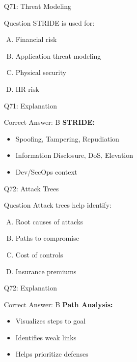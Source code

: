 \documentclass{beamer}
\begin{document}
			\begin{frame}{Q71: Threat Modeling}
				\begin{block}{Question}
					STRIDE is used for:
				\end{block}
				\begin{enumerate}[(A)]
					\item Financial risk
					\item Application threat modeling
					\item Physical security
					\item HR risk
				\end{enumerate}
			\end{frame}
			\begin{frame}{Q71: Explanation}
				\begin{block}{Correct Answer: B}
					\textbf{STRIDE:}
					\begin{itemize}
						\item Spoofing, Tampering, Repudiation
						\item Information Disclosure, DoS, Elevation
						\item Dev/SecOps context
					\end{itemize}
				\end{block}
			\end{frame}
			
			\begin{frame}{Q72: Attack Trees}
				\begin{block}{Question}
					Attack trees help identify:
				\end{block}
				\begin{enumerate}[(A)]
					\item Root causes of attacks
					\item Paths to compromise
					\item Cost of controls
					\item Insurance premiums
				\end{enumerate}
			\end{frame}
			\begin{frame}{Q72: Explanation}
				\begin{block}{Correct Answer: B}
					\textbf{Path Analysis:}
					\begin{itemize}
						\item Visualizes steps to goal
						\item Identifies weak links
						\item Helps prioritize defenses
					\end{itemize}
				\end{block}
			\end{frame}
			
\end{document}
